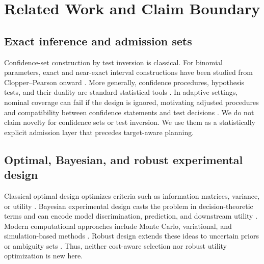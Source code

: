 \documentclass[11pt]{article}
\begin{document}
\section{Related Work and Claim Boundary}
\subsection{Exact inference and admission sets}
Confidence-set construction by test inversion is classical. For binomial parameters, exact and near-exact interval constructions have been studied from Clopper--Pearson onward \parencite{clopper1934,sterne1954,blyth1983,brown2001,agresti1998,blaker2000}. More generally, confidence procedures, hypothesis tests, and their duality are standard statistical tools \parencite{lehmann2005,casella2002,wasserman2004,vanDerVaart1998}. In adaptive settings, nominal coverage can fail if the design is ignored, motivating adjusted procedures and compatibility between confidence statements and test decisions \parencite{posch2013,hadad2021,robertson2025a,robertson2025b}. We do not claim novelty for confidence sets or test inversion. We use them as a statistically explicit admission layer that precedes target-aware planning.

\subsection{Optimal, Bayesian, and robust experimental design}
Classical optimal design optimizes criteria such as information matrices, variance, or utility \parencite{fedorov1972,pukelsheim1993,atkinson2007,berger1985,bernardo1979}. Bayesian experimental design casts the problem in decision-theoretic terms and can encode model discrimination, prediction, and downstream utility \parencite{lindley1956,chaloner1995,ryan2016,overstall2022}. Modern computational approaches include Monte Carlo, variational, and simulation-based methods \parencite{foster2019,foster2020,kleinegesse2020,ivanova2021}. Robust design extends these ideas to uncertain priors or ambiguity sets \parencite{go2022}. Thus, neither cost-aware selection nor robust utility optimization is new here.
\end{document}
